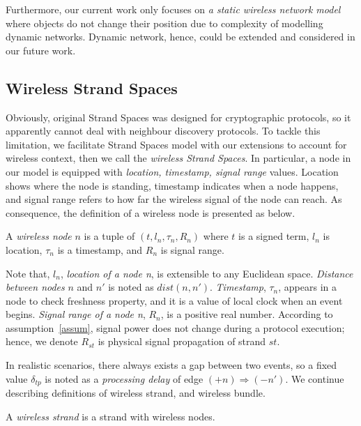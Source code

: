Furthermore, our current work only focuses on \textit{a static wireless network model} where objects do not change their position due to complexity of modelling dynamic networks. Dynamic network, hence, could be extended and considered in our future work. 

\subsection{Wireless Strand Spaces}


Obviously, original Strand Spaces was designed for cryptographic protocols, so it apparently cannot deal with neighbour discovery protocols. To tackle this limitation, we facilitate Strand Spaces model with our extensions to account for wireless context, then we call the \textit{wireless Strand Spaces}. In particular, a node in our model is equipped with \textit{location, timestamp, signal range} values. Location shows where the node is standing, timestamp indicates when a node happens, and signal range refers to how far the wireless signal of the node can reach. As consequence, the definition of a wireless node is presented as below.

\begin{Definition} A \emph{wireless node} $n$ is a tuple of $(t, l_n, \tau_{n}, R_n)$ where $t$ is a signed term, $l_n$ is location, $\tau_{n}$ is a timestamp, and $R_n$ is signal range.\end{Definition}

Note that, $l_n$, \textit{location of a node n}, is extensible to any Euclidean space. \textit{Distance between nodes} $n$ and $n'$ is noted as $dist(n,n')$. \textit{Timestamp}, $\tau_{n}$, appears in a node to check freshness property, and it is a value of local clock when an event begins. \textit{Signal range of a node n}, $R_n$, is a positive real number. According to assumption~\ref{assum}, signal power does not change during a protocol execution; hence, we denote $R_{st}$ is physical signal  propagation of strand $st$. 

In realistic scenarios, there always exists a gap between two events, so a fixed value $\delta_{tp}$ is noted as a \textit{processing delay} of edge $ (+n) \Rightarrow (-n')$. We continue describing definitions of wireless strand, and wireless bundle. 

\begin{Definition} A \emph{wireless strand} is a strand with wireless nodes.
\end{Definition}

